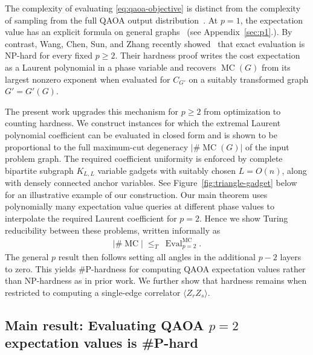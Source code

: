 \documentclass[11pt]{article}
\newcommand{\mc}{\operatorname{MC}}
\newcommand{\Eval}{\operatorname{Eval}}
\newcommand{\M}{\#\mc}
\begin{document}
The complexity of evaluating \eqref{eq:qaoa-objective} is distinct from the complexity of
sampling from the full QAOA output distribution~\cite{farhi2016quantum}.  At $p=1$, the expectation value has an explicit
formula on general graphs~\cite{Farhi2014,Wang2018} (see Appendix~\ref{sec:p1}.).  By contrast, Wang, Chen, Sun,
and Zhang recently showed~\cite{WangEtAl2025} that exact evaluation is NP-hard for every fixed $p\geq2$. %
Their hardness proof writes the cost expectation as a Laurent polynomial in a %
phase
variable and recovers $\mc(G)$ from its largest nonzero exponent when evaluated for $C_{G'}$ on a suitably transformed graph $G'=G'(G)$.


The present work upgrades this mechanism for $p\geq 2$ from optimization to counting hardness.  
We construct instances for
which %
the 
extremal %
Laurent polynomial coefficient can be evaluated in closed form and is shown to be proportional to the full
maximum-cut degeneracy $|\M(G)|$ of the input problem graph.  
The required coefficient uniformity is enforced by %
complete bipartite subgraph  
$K_{L,L}$ variable gadgets with suitably chosen $L=O(n)$,
along with densely connected anchor variables. 
See Figure~\ref{fig:triangle-gadget} below for an illustrative example of our construction. 
Our main theorem uses polynomially many expectation value queries at different phase values to interpolate the required Laurent coefficient for $p=2$.  
Hence we show Turing reducibility between these problems, written informally as 
\begin{eqnarray*}
    |\M| \; \leq_T\; \Eval^{\mathrm{MC}}_{p=2}.
\end{eqnarray*}
The general $p$ result then follows setting all angles in the additional $p-2$ layers to zero. 
This yields $\#$P-hardness for computing QAOA expectation values rather than NP-hardness as in prior work. %
We further show that hardness remains when restricted to computing a single-edge
correlator $\langle Z_rZ_s\rangle$. %






\subsection{Main result: Evaluating QAOA $p=2$ expectation values is \#P-hard}
\end{document}
